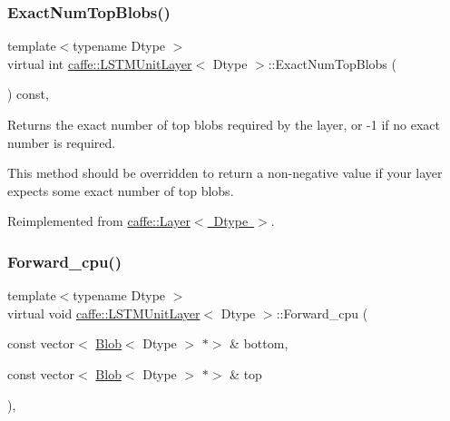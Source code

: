 \subsubsection{\texorpdfstring{Exact\+Num\+Top\+Blobs()}{ExactNumTopBlobs()}\hspace{0.1cm}{\footnotesize\ttfamily [2/2]}}
{\footnotesize\ttfamily template$<$typename Dtype $>$ \\
virtual int \mbox{\hyperlink{classcaffe_1_1_l_s_t_m_unit_layer}{caffe\+::\+L\+S\+T\+M\+Unit\+Layer}}$<$ Dtype $>$\+::Exact\+Num\+Top\+Blobs (\begin{DoxyParamCaption}{ }\end{DoxyParamCaption}) const\hspace{0.3cm}{\ttfamily [inline]}, {\ttfamily [virtual]}}



Returns the exact number of top blobs required by the layer, or -\/1 if no exact number is required. 

This method should be overridden to return a non-\/negative value if your layer expects some exact number of top blobs. 

Reimplemented from \mbox{\hyperlink{classcaffe_1_1_layer_a64e2ca72c719e4b2f1f9216ccfb0d37f}{caffe\+::\+Layer$<$ Dtype $>$}}.

\mbox{\label{classcaffe_1_1_l_s_t_m_unit_layer_adaa55c52685e42525b1a742b65a91362}} 
\subsubsection{\texorpdfstring{Forward\+\_\+cpu()}{Forward\_cpu()}\hspace{0.1cm}{\footnotesize\ttfamily [1/2]}}
{\footnotesize\ttfamily template$<$typename Dtype $>$ \\
virtual void \mbox{\hyperlink{classcaffe_1_1_l_s_t_m_unit_layer}{caffe\+::\+L\+S\+T\+M\+Unit\+Layer}}$<$ Dtype $>$\+::Forward\+\_\+cpu (\begin{DoxyParamCaption}\item[{const vector$<$ \mbox{\hyperlink{classcaffe_1_1_blob}{Blob}}$<$ Dtype $>$ $\ast$$>$ \&}]{bottom,  }\item[{const vector$<$ \mbox{\hyperlink{classcaffe_1_1_blob}{Blob}}$<$ Dtype $>$ $\ast$$>$ \&}]{top }\end{DoxyParamCaption})\hspace{0.3cm}{\ttfamily [protected]}, {\ttfamily [virtual]}}


